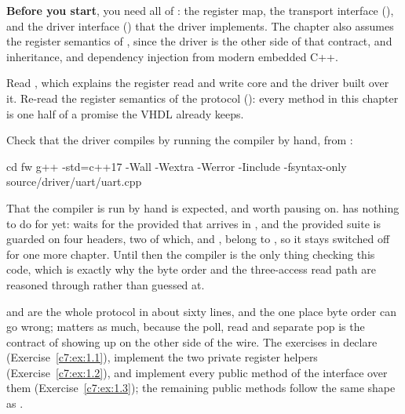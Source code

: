 \textbf{Before you start}, you need all of : the register map, the transport interface
(), and the driver interface () that
the driver implements. The chapter also assumes the register semantics of , since the
driver is the other side of that contract, and inheritance,  and dependency injection
from modern embedded C++.

Read , which explains the register read and write core and the driver built
over it. Re-read the register semantics of the protocol (): every method in
this chapter is one half of a promise the VHDL already keeps.

Check that the driver compiles by running the compiler by hand, from :

\begin{shell}
cd fw
g++ -std=c++17 -Wall -Wextra -Werror -Iinclude -fsyntax-only source/driver/uart/uart.cpp
\end{shell}

\noindent That the compiler is run by hand is expected, and worth pausing on. 
has nothing to do for  yet:  waits for the provided
 that arrives in , and the provided suite is guarded on four
headers, two of which,  and , belong
to , so it stays switched off for one more chapter. Until then the compiler is the only
thing checking this code, which is exactly why the byte order and the three-access read path are
reasoned through rather than guessed at.

 and  are the whole protocol in about sixty lines, and the one place
byte order can go wrong;  matters as much, because the poll, read and separate pop is
the contract of  showing up on the other side of the wire. The exercises in
 declare 
(Exercise~\ref{c7:ex:1.1}), implement the two private register helpers
(Exercise~\ref{c7:ex:1.2}), and implement every public method of the interface over them
(Exercise~\ref{c7:ex:1.3}); the remaining public methods follow the same shape as .




